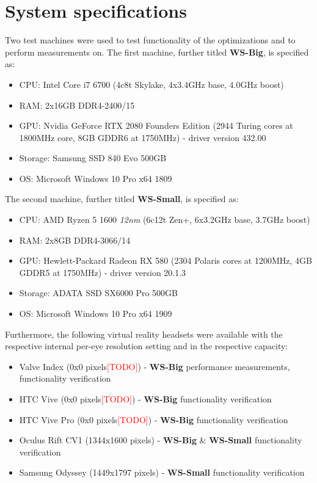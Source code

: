 \section{System specifications}
Two test machines were used to test functionality of the optimizations and to perform measurements on. 
The first machine, further titled \textbf{WS-Big}, is specified as:
\begin{itemize}
\item CPU: Intel Core i7 6700 (4c8t Skylake, 4x3.4GHz base, 4.0GHz boost)
\item RAM: 2x16GB DDR4-2400/15
\item GPU: Nvidia GeForce RTX 2080 Founders Edition (2944 Turing cores at 1800MHz core, 8GB GDDR6 at 1750MHz) - driver version 432.00
\item Storage: Samsung SSD 840 Evo 500GB
\item OS: Microsoft Windows 10 Pro x64 1809
\end{itemize} 
The second machine, further titled \textbf{WS-Small}, is specified as:
\begin{itemize}
\item CPU: AMD Ryzen 5 1600 \textit{12nm} (6c12t Zen+, 6x3.2GHz base, 3.7GHz boost)
\item RAM: 2x8GB DDR4-3066/14
\item GPU: Hewlett-Packard Radeon RX 580 (2304 Polaris cores at 1200MHz, 4GB GDDR5 at 1750MHz) - driver version 20.1.3
\item Storage: ADATA SSD SX6000 Pro 500GB
\item OS: Microsoft Windows 10 Pro x64 1909
\end{itemize} 
Furthermore, the following virtual reality headsets were available with the respective internal per-eye resolution setting and in the respective capacity:
\begin{itemize}
\item Valve Index (0x0 pixels\textcolor{red}{[TODO]}) - \textbf{WS-Big} performance measurements, functionality verification
\item HTC Vive (0x0 pixels\textcolor{red}{[TODO]}) - \textbf{WS-Big} functionality verification
\item HTC Vive Pro (0x0 pixels\textcolor{red}{[TODO]}) - \textbf{WS-Big} functionality verification
\item Oculus Rift CV1 (1344x1600 pixels) - \textbf{WS-Big} \& \textbf{WS-Small} functionality verification
\item Samsung Odyssey (1449x1797 pixels) - \textbf{WS-Small} functionality verification
\end{itemize} 
